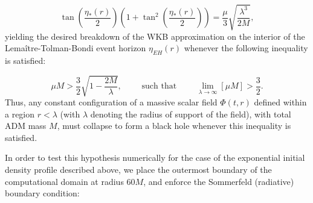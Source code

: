 \documentclass{article}
\begin{document}
\begin{equation}
\tan \left( \frac{\eta_{*} \left( r \right)}{2} \right) \left( 1 + \tan^2 \left( \frac{\eta_{*} \left( r \right)}{2} \right) \right) = \frac{\mu}{3} \sqrt{\frac{\lambda^3}{2M}},
\end{equation}
yielding the desired breakdown of the WKB approximation on the interior of the Lema\^itre-Tolman-Bondi event horizon ${\eta_{EH} \left( r \right)}$ whenever the following inequality is satisfied:

\begin{equation}
\mu M > \frac{3}{2} \sqrt{1 - \frac{2M}{\lambda}}, \qquad \text{ such that } \qquad \lim_{\lambda \to \infty} \left[ \mu M \right] > \frac{3}{2}.
\end{equation}
Thus, any constant configuration of a massive scalar field ${\Phi \left( t, r \right)}$ defined within a region ${r < \lambda}$ (with ${\lambda}$ denoting the radius of support of the field), with total ADM mass $M$, must collapse to form a black hole whenever this inequality is satisfied.

In order to test this hypothesis numerically for the case of the exponential initial density profile described above, we place the outermost boundary of the computational domain at radius ${60 M}$, and enforce the Sommerfeld (radiative) boundary condition:
\end{document}
